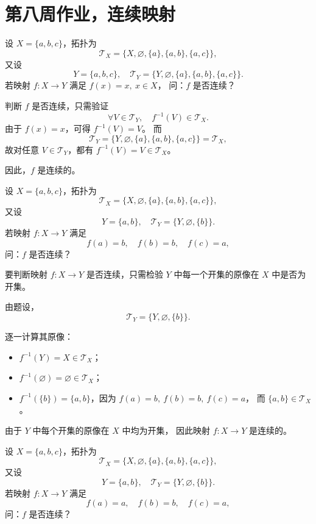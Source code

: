 \section{第八周作业，连续映射}
\begin{homework}[7]
设 $X=\{a,b,c\}$，拓扑为 
\[
\mathcal{T}_X=\{X,\varnothing,\{a\},\{a,b\},\{a,c\}\},
\]
又设
\[
Y=\{a,b,c\},\quad 
\mathcal{T}_Y=\{Y,\varnothing,\{a\},\{a,b\},\{a,c\}\}.
\]
若映射 $f:X\to Y$ 满足 $f(x)=x,\ x\in X$，  
问：$f$ 是否连续？
\end{homework}
\begin{solution}
判断 $f$ 是否连续，只需验证
\[
\forall V\in\mathcal{T}_Y,\quad f^{-1}(V)\in\mathcal{T}_X.
\]
由于 $f(x)=x$，可得 $f^{-1}(V)=V$。  
而
\[
\mathcal{T}_Y=\{Y,\varnothing,\{a\},\{a,b\},\{a,c\}\}
=\mathcal{T}_X,
\]
故对任意 $V\in\mathcal{T}_Y$，都有 $f^{-1}(V)=V\in\mathcal{T}_X$。

因此，$f$ 是连续的。
\end{solution}
\begin{homework}[8]
设 $X=\{a,b,c\}$，拓扑为 
\[
\mathcal{T}_X=\{X,\varnothing,\{a\},\{a,b\},\{a,c\}\},
\]
又设
\[
Y=\{a,b\},\quad 
\mathcal{T}_Y=\{Y,\varnothing,\{b\}\}.
\]
若映射 $f:X\to Y$ 满足 
\[
f(a)=b,\quad f(b)=b,\quad f(c)=a,
\]
问：$f$ 是否连续？
\end{homework}
\begin{solution}
要判断映射 $f:X\to Y$ 是否连续，只需检验 $Y$ 中每一个开集的原像在 $X$ 中是否为开集。

由题设，
\[
\mathcal{T}_Y=\{Y,\varnothing,\{b\}\}.
\]

逐一计算其原像：

\begin{itemize}
  \item $f^{-1}(Y)=X\in\mathcal{T}_X$；
  \item $f^{-1}(\varnothing)=\varnothing\in\mathcal{T}_X$；
  \item $f^{-1}(\{b\})=\{a,b\}$，因为 $f(a)=b,\ f(b)=b,\ f(c)=a$，
        而 $\{a,b\}\in\mathcal{T}_X$。
\end{itemize}

由于 $Y$ 中每个开集的原像在 $X$ 中均为开集，
因此映射 $f:X\to Y$ 是连续的。
\end{solution}
\begin{homework}[9]
设 $X=\{a,b,c\}$，拓扑为 
\[
\mathcal{T}_X=\{X,\varnothing,\{a\},\{a,b\},\{a,c\}\},
\]
又设
\[
Y=\{a,b\},\quad 
\mathcal{T}_Y=\{Y,\varnothing,\{b\}\}.
\]
若映射 $f:X\to Y$ 满足 
\[
f(a)=a,\quad f(b)=b,\quad f(c)=a,
\]
问：$f$ 是否连续？
\end{homework}
